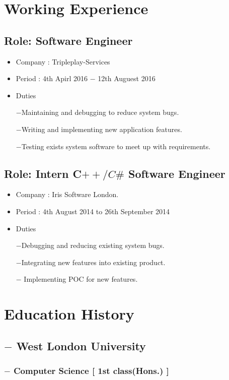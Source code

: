 \documentclass[11px]{article}
\begin{document}
 \section*{Working Experience}
  \subsection*{Role: Software Engineer}
  \begin{itemize}
  	\item  Company : Tripleplay-Services
  	\item Period   : 4th Apirl 2016 $-$  12th Auguest 2016
  	\item Duties
  	
  	   $-$Maintaining and debugging to reduce system bugs. 
  	   
  	   $-$Writing and implementing new application features.
  	   
  	   $-$Testing exists system software to meet up with requirements.
  \end{itemize}


  \subsection*{Role: Intern C$++/C\#$ Software Engineer}
  \begin{itemize}
  	\item  Company :  Iris Software London.
  	\item Period   : 4th August 2014 to 26th September 2014
  	\item Duties
  	
       $-$Debugging and reducing  existing system bugs.
       
       $-$Integrating new features into existing product.
       
       $-$ Implementing POC for new features.
  \end{itemize}
  
 \hrulefill
\section*{Education History}
\subsection*{$-$ West London University}
\subsubsection*{$-$ Computer Science [ 1st class(Hons.) ]}
\end{document}
